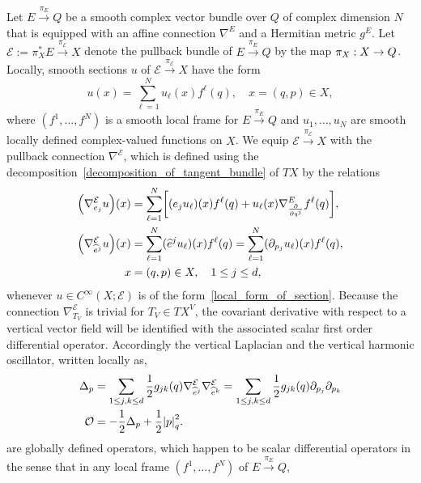 \documentclass[AHL,Unicode,longabstracts]{cedram}
\newcommand{\clO}{\mathcal{O}}
\newcommand{\clE}{\mathcal{E}}
\newcommand{\p}{\partial}
\newcommand{\abs}[1]{\left| #1 \right|}
\let\originalleft\left
\let\originalright\right
\renewcommand{\left}{\mathopen{}\mathclose\bgroup\originalleft}
\renewcommand{\right}{\aftergroup\egroup\originalright}
\renewcommand*{\to}{\mathchoice{\longrightarrow}{\rightarrow}{\rightarrow}{\rightarrow}}
\begin{document}
Let $E \xrightarrow{\pi_E} Q$ be a smooth complex vector bundle over $Q$ of complex dimension $N$ that is equipped with an affine connection $\nabla^E$ and a Hermitian metric $g^E$. Let $\clE := \pi_X^* E \xrightarrow{\pi_{\clE}} X$ denote the pullback bundle of $E \xrightarrow{\pi_E} Q$ by the map $\pi_X: X \to Q$. Locally, smooth sections $u$ of $\clE \xrightarrow{\pi_{\clE}} X$ have the form
\begin{equation}\label{local_form_of_section}
u(x) = \sum_{\ell = 1}^{N} u_\ell(x) f^\ell(q), \quad x = (q,p) \in X,
\end{equation}
where $(f^1, \dots, f^{N})$ is a smooth local frame for $E \xrightarrow{\pi_E} Q$ and $u_1, \dots, u_N$ are smooth locally defined complex-valued functions on $X$. We equip $\clE \xrightarrow{\pi_\clE} X$ with the pullback connection $\nabla^{\clE}$, which is defined using the decomposition~\eqref{decomposition_of_tangent_bundle} of $TX$ by the relations
\begin{equation}
\begin{aligned}
\left(\nabla^{\clE}_{e_j} u \right)(x) &= \sum_{\ell=1}^{N} \left[(e_j u_\ell)(x) f^\ell(q) + u_\ell(x) \nabla^E_{\frac{\p}{\p q^j}} f^\ell(q)\right], \\
\left(\nabla^{\clE}_{\widehat{e}^j} u \right)(x) &= \sum_{\ell=1}^{N} (\widehat{e}^j u_\ell)(x) f^\ell(q)=\sum_{\ell=1}^{N}(\partial_{p_{j}}u_{\ell})(x)f^{\ell}(q) , \\
x &= (q,p) \in X, \quad 1 \le j \le d,
\end{aligned}
\end{equation}
whenever $u \in C^\infty(X; \clE)$ is of the form~\eqref{local_form_of_section}. Because the connection $\nabla^{\clE}_{T_{V}}$ is trivial for $T_{V}\in TX^{V}$, the covariant derivative with respect to a vertical vector field will be identified with the associated scalar first order differential operator. Accordingly the vertical Laplacian and the vertical harmonic oscillator, written locally as,
\begin{align}
\Delta_p &= \sum_{1 \le j, k \le d} \frac{1}{2} g_{jk}(q) \nabla^{\clE}_{\widehat{e}^j} \nabla^{\clE}_{\widehat{e}^k}=\sum_{1\leq j,k\le d} \frac{1}{2} g_{jk}(q) \partial_{p_{j}}\partial_{p_{k}}
\label{vertical_laplacian}
\\
\clO &= -\frac{1}{2} \Delta_p + \frac{1}{2} \abs{p}_{q}^2.\label{scalar_vertical_harmonic_oscillator}
\end{align}
are globally defined operators, which happen to be scalar differential operators in the sense that in any local frame $(f^{1},\dots,f^{N})$ of $E\xrightarrow{\pi_{E}} Q$,
\end{document}
